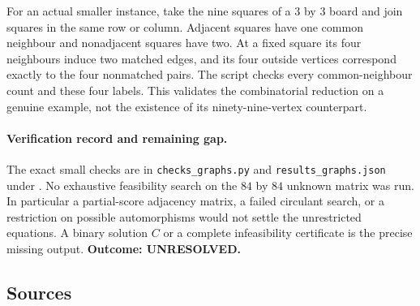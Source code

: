 \documentclass[11pt,a4paper]{article}
\begin{document}
For an actual smaller instance, take the nine squares of a $3$ by $3$
board and join squares in the same row or column. Adjacent squares have
one common neighbour and nonadjacent squares have two. At a fixed
square its four neighbours induce two matched edges, and its four
outside vertices correspond exactly to the four nonmatched pairs.
The script checks every common-neighbour count and these four labels.
This validates the combinatorial reduction on a genuine example,
not the existence of its ninety-nine-vertex counterpart.

\paragraph{Verification record and remaining gap.}
The exact small checks are in \texttt{checks\_graphs.py} and
\texttt{results\_graphs.json} under
.
No exhaustive feasibility search on the $84$ by $84$ unknown matrix
was run. In particular a partial-score adjacency matrix, a failed
circulant search, or a restriction on possible automorphisms would not
settle the unrestricted equations. A binary solution $C$ or a complete
infeasibility certificate is the precise missing output.
\textbf{Outcome: UNRESOLVED.}

\subsection{Sources}
\end{document}
